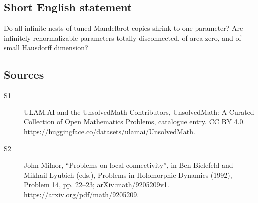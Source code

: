 \documentclass[11pt]{article}
\begin{document}
\subsection{Short English statement}
Do all infinite nests of tuned Mandelbrot copies shrink to one parameter? Are infinitely renormalizable parameters totally disconnected, of area zero, and of small Hausdorff dimension?
\subsection{Sources}
\begin{description}
\item[\hypertarget{source:statement:1}{S1}] ULAM.AI and the UnsolvedMath Contributors, UnsolvedMath: A Curated Collection of Open Mathematics Problems, catalogue entry. CC BY 4.0. \url{https://huggingface.co/datasets/ulamai/UnsolvedMath}.
\item[\hypertarget{source:statement:2}{S2}] John Milnor, ``Problems on local connectivity'', in Ben Bielefeld and Mikhail Lyubich (eds.), Problems in Holomorphic Dynamics (1992), Problem 14, pp. 22--23; arXiv:math/9205209v1. \url{https://arxiv.org/pdf/math/9205209}.
\end{description}
\label{end:statement}
\end{document}
